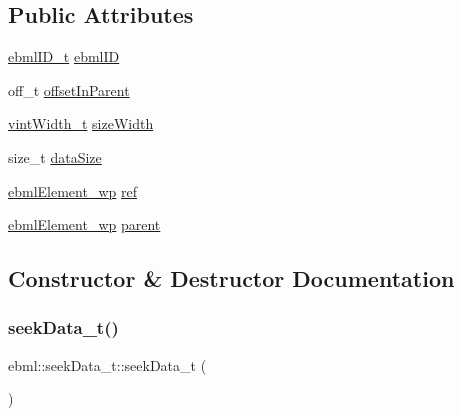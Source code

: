 \subsection*{Public Attributes}
\begin{DoxyCompactItemize}
\item 
\mbox{\hyperlink{namespaceebml_a86c5f604ddf12a74aa9812e997a58691}{ebml\+I\+D\+\_\+t}} \mbox{\hyperlink{classebml_1_1seekData__t_aeebc9c60a3157c2e8963dff000016111}{ebml\+ID}}
\item 
off\+\_\+t \mbox{\hyperlink{classebml_1_1seekData__t_a0c34ad1abeed44ddb521abac8dfe107a}{offset\+In\+Parent}}
\item 
\mbox{\hyperlink{namespaceebml_a2ccdfb60b23efb51fe07f9d066e23604}{vint\+Width\+\_\+t}} \mbox{\hyperlink{classebml_1_1seekData__t_aaebccafee18298ba365b784acbc6df6b}{size\+Width}}
\item 
size\+\_\+t \mbox{\hyperlink{classebml_1_1seekData__t_a0a25256a0cd61d4077bb37e064198125}{data\+Size}}
\item 
\mbox{\hyperlink{namespaceebml_a495fb58b42b0050d887415351af02935}{ebml\+Element\+\_\+wp}} \mbox{\hyperlink{classebml_1_1seekData__t_af9e91ea27623cf9d36ef45f8202e4f46}{ref}}
\item 
\mbox{\hyperlink{namespaceebml_a495fb58b42b0050d887415351af02935}{ebml\+Element\+\_\+wp}} \mbox{\hyperlink{classebml_1_1seekData__t_aa2137b3e5ee53c2e90754fa44f81f2ef}{parent}}
\end{DoxyCompactItemize}


\subsection{Constructor \& Destructor Documentation}
\mbox{\label{classebml_1_1seekData__t_a985802e7677dbec9e039baa983cd2bfc}} 
\subsubsection{\texorpdfstring{seek\+Data\+\_\+t()}{seekData\_t()}\hspace{0.1cm}{\footnotesize\ttfamily [1/7]}}
{\footnotesize\ttfamily ebml\+::seek\+Data\+\_\+t\+::seek\+Data\+\_\+t (\begin{DoxyParamCaption}\item[{const \mbox{\hyperlink{classebml_1_1parseFile}{parse\+File}} \&}]{ }\end{DoxyParamCaption})}

